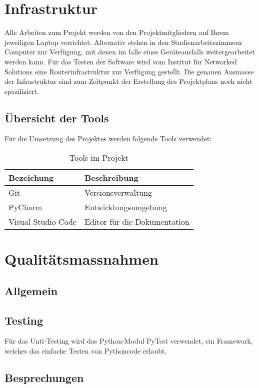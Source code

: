 \documentclass[
	ngerman,
	toc=listof, %
	toc=bibliography, %
	footnotes=multiple, %
	parskip=half, %
	numbers=noendperiod %
]{scrartcl}
\begin{document}
\section{Infrastruktur}
	Alle Arbeiten zum Projekt werden von den Projektmitgliedern auf Ihrem jeweiligen Laptop verrichtet.
	Alternativ stehen in den Studienarbeitszimmern Computer zur Verfügung, mit denen im falle eines Geräteausfalls weitergearbeitet werden kann.
	Für das Testen der Software wird vom Institut für Networked Solutions eine Routerinfrastruktur zur Verfügung gestellt.
	Die genauen Ausmasse der Infrastruktur sind zum Zeitpunkt der Erstellung des Projektplans noch nicht spezifiziert.
	

	\subsection{Übersicht der Tools}
		Für die Umsetzung des Projektes werden folgende Tools verwendet: \\[2ex]
		\begin{table}[!h]
			\begin{tabularx}{0.9\linewidth}{lX}
				\toprule
				Bezeichung & Beschreibung \\
				\midrule
				Git & Versionsverwaltung \\
				PyCharm & Entwicklungsumgebung \\
				Visual Studio Code & Editor für die Dokumentation\\
				\bottomrule
			\end{tabularx}
		\caption{Tools im Projekt}
		\end{table}
		
		

\section{Qualitätsmassnahmen}
	\subsection{Allgemein}

	\subsection{Testing}
		Für das Unti-Testing wird das Python-Modul PyTest verwendet, ein Framework, welches das einfache Testen von Pythoncode erlaubt.

	\subsection{Besprechungen}
\end{document}
